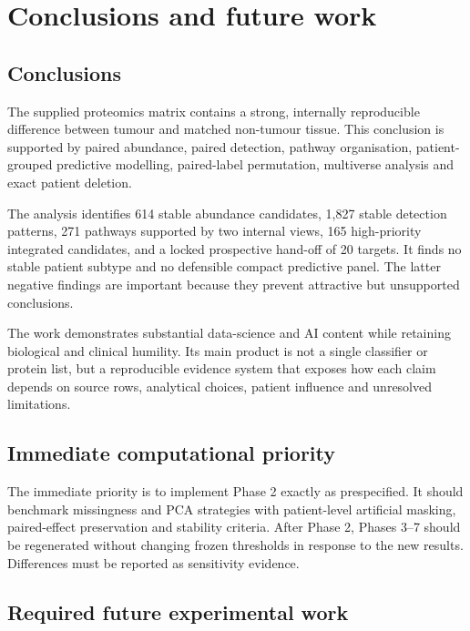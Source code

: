 \chapter{Conclusions and future work}
\label{chap:conclusions_and_future_work}

\section{Conclusions}
\label{sec:conclusions}

The supplied proteomics matrix contains a strong, internally reproducible difference between tumour and matched non-tumour tissue. This conclusion is supported by paired abundance, paired detection, pathway organisation, patient-grouped predictive modelling, paired-label permutation, multiverse analysis and exact patient deletion.

The analysis identifies 614 stable abundance candidates, 1,827 stable detection patterns, 271 pathways supported by two internal views, 165 high-priority integrated candidates, and a locked prospective hand-off of 20 targets. It finds no stable patient subtype and no defensible compact predictive panel. The latter negative findings are important because they prevent attractive but unsupported conclusions.

The work demonstrates substantial data-science and AI content while retaining biological and clinical humility. Its main product is not a single classifier or protein list, but a reproducible evidence system that exposes how each claim depends on source rows, analytical choices, patient influence and unresolved limitations.

\section{Immediate computational priority}
\label{sec:immediate_computational_priority}

The immediate priority is to implement Phase 2 exactly as prespecified. It should benchmark missingness and PCA strategies with patient-level artificial masking, paired-effect preservation and stability criteria. After Phase 2, Phases 3–7 should be regenerated without changing frozen thresholds in response to the new results. Differences must be reported as sensitivity evidence.

\section{Required future experimental work}
\label{sec:required_future_experimental_work}

